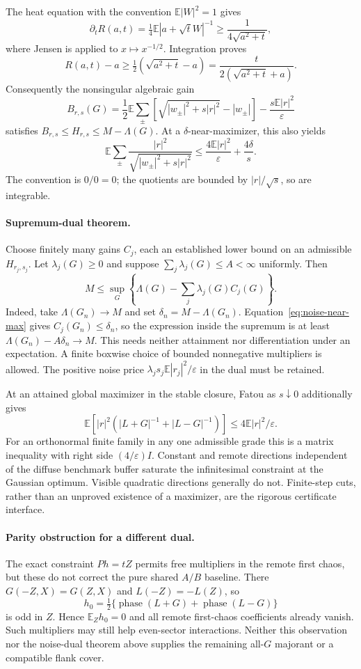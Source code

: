The heat equation with the convention $\mathbb E|W|^2=1$ gives
\[
 \partial_tR(a,t)=\tfrac14\mathbb E|a+\sqrt tW|^{-1}
 \ge\frac1{4\sqrt{a^2+t}},
\]
where Jensen is applied to $x\mapsto x^{-1/2}$. Integration proves
\[
 R(a,t)-a\ge\tfrac12(\sqrt{a^2+t}-a)
 =\frac{t}{2(\sqrt{a^2+t}+a)}.
\]
Consequently the nonsingular algebraic gain
\[
 B_{r,s}(G)=\frac12\mathbb E\sum_{\pm}
 [\sqrt{|w_\pm|^2+s|r|^2}-|w_\pm|]
 -\frac{s\mathbb E|r|^2}{\varepsilon}
\]
satisfies $B_{r,s}\le H_{r,s}\le M-\Lambda(G)$. At a
$\delta$-near-maximizer, this also yields
\[
 \mathbb E\sum_{\pm}
 \frac{|r|^2}{\sqrt{|w_\pm|^2+s|r|^2}}
 \le\frac{4\mathbb E|r|^2}{\varepsilon}+\frac{4\delta}{s}.
\]
The convention is $0/0=0$; the quotients are bounded by
$|r|/\sqrt s$, so are integrable.

\paragraph{Supremum-dual theorem.}
Choose finitely many gains $C_j$, each an established lower bound on an
admissible $H_{r_j,s_j}$. Let $\lambda_j(G)\ge0$ and suppose
$\sum_j\lambda_j(G)\le A<\infty$ uniformly. Then
\begin{equation}\label{eq:noise-sup-dual}
 M\le\sup_G\left\{\Lambda(G)-\sum_j\lambda_j(G)C_j(G)\right\}.
\end{equation}
Indeed, take $\Lambda(G_n)\to M$ and set
$\delta_n=M-\Lambda(G_n)$. Equation~\eqref{eq:noise-near-max}
gives $C_j(G_n)\le\delta_n$, so the expression inside the supremum is
at least $\Lambda(G_n)-A\delta_n\to M$. This needs neither attainment
nor differentiation under an expectation. A finite boxwise choice of
bounded nonnegative multipliers is allowed. The positive noise price
$\lambda_j s_j\mathbb E|r_j|^2/\varepsilon$ in the dual must be retained.

At an attained global maximizer in the stable closure, Fatou as $s\downarrow0$
additionally gives
\[
 \mathbb E\left[|r|^2
 (|L+G|^{-1}+|L-G|^{-1})\right]
 \le4\mathbb E|r|^2/\varepsilon.
\]
For an orthonormal finite family in any one admissible grade this is a
matrix inequality with right side $(4/\varepsilon)I$. Constant and
remote directions independent of the diffuse benchmark buffer saturate
the infinitesimal constraint at the Gaussian optimum. Visible quadratic
directions generally do not. Finite-step cuts, rather than an unproved
existence of a maximizer, are the rigorous certificate interface.

\paragraph{Parity obstruction for a different dual.}
The exact constraint $Ph=tZ$ permits free multipliers in the remote first
chaos, but these do not correct the pure shared $A/B$ baseline.
There $G(-Z,X)=G(Z,X)$ and $L(-Z)=-L(Z)$, so
\[
 h_0=\tfrac12\{\operatorname{phase}(L+G)+
                   \operatorname{phase}(L-G)\}
\]
is odd in $Z$. Hence $\mathbb E_Zh_0=0$ and all remote first-chaos
coefficients already vanish. Such multipliers may still help even-sector
interactions. Neither this observation nor the noise-dual theorem above
supplies the remaining all-$G$ majorant or a compatible flank cover.



